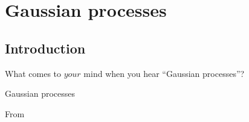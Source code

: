 \section{Gaussian processes}


\subsection{Introduction}

\begin{frame}{What comes to $your$ mind when you hear ``Gaussian processes''?}
\end{frame}

\begin{frame}{Gaussian processes}
\begin{center}
\end{center}
\hfill From \citet{Rasmussen:2006aa}
\end{frame}

